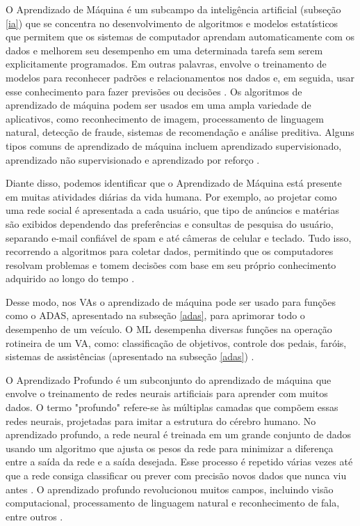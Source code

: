 O Aprendizado de Máquina é um subcampo da inteligência artificial (subseção \ref{ia}) que se concentra no desenvolvimento de algoritmos e modelos estatísticos que permitem que os sistemas de computador aprendam automaticamente com os dados e melhorem seu desempenho em uma determinada tarefa sem serem explicitamente programados. Em outras palavras, envolve o treinamento de modelos para reconhecer padrões e relacionamentos nos dados e, em seguida, usar esse conhecimento para fazer previsões ou decisões \cite{review-auto}. Os algoritmos de aprendizado de máquina podem ser usados em uma ampla variedade de aplicativos, como reconhecimento de imagem, processamento de linguagem natural, detecção de fraude, sistemas de recomendação e análise preditiva. Alguns tipos comuns de aprendizado de máquina incluem aprendizado supervisionado, aprendizado não supervisionado e aprendizado por reforço \cite{software-review, software-cnn}.

Diante disso, podemos identificar que o Aprendizado de Máquina está presente em muitas atividades diárias da vida humana. Por exemplo, ao projetar como uma rede social é apresentada a cada usuário, que tipo de anúncios e matérias são exibidos dependendo das preferências e consultas de pesquisa do usuário, separando e-mail confiável de spam e até câmeras de celular e teclado. Tudo isso, recorrendo a algoritmos para coletar dados, permitindo que os computadores resolvam problemas e tomem decisões com base em seu próprio conhecimento adquirido ao longo do tempo \cite{caio}.

Desse modo, nos VAs o aprendizado de máquina pode ser usado para funções como o ADAS, apresentado na subseção \ref{adas}, para aprimorar todo o desempenho de um veículo. O ML desempenha diversas funções na operação rotineira de um VA, como: classificação de objetivos, controle dos pedais, faróis, sistemas de assistências (apresentado na subseção \ref{adas}) \cite{aplicacao2}.

 \label{Profunda}

O Aprendizado Profundo é um subconjunto do aprendizado de máquina que envolve o treinamento de redes neurais artificiais para aprender com muitos dados. O termo "profundo" refere-se às múltiplas camadas que compõem essas redes neurais, projetadas para imitar a estrutura do cérebro humano. No aprendizado profundo, a rede neural é treinada em um grande conjunto de dados usando um algoritmo que ajusta os pesos da rede para minimizar a diferença entre a saída da rede e a saída desejada. Esse processo é repetido várias vezes até que a rede consiga classificar ou prever com precisão novos dados que nunca viu antes \cite{software-cnn}. O aprendizado profundo revolucionou muitos campos, incluindo visão computacional, processamento de linguagem natural e reconhecimento de fala, entre outros \cite{review-auto, software-review}. 

